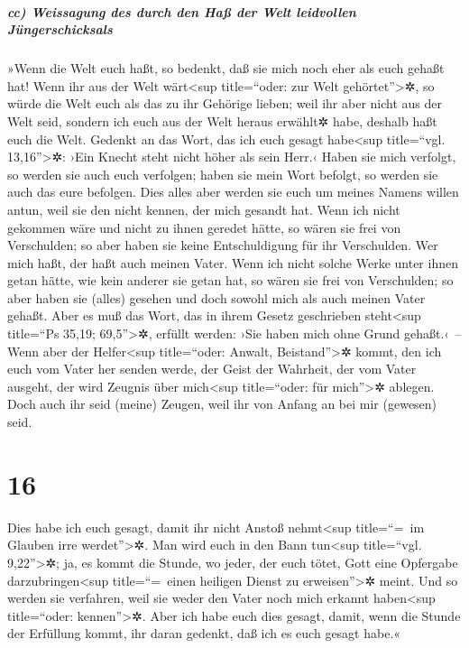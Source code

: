 \hypertarget{cc-weissagung-des-durch-den-hauxdf-der-welt-leidvollen-juxfcngerschicksals}{%
\subparagraph{cc) Weissagung des durch den Haß der Welt leidvollen
Jüngerschicksals}\label{cc-weissagung-des-durch-den-hauxdf-der-welt-leidvollen-juxfcngerschicksals}}

 »Wenn die Welt euch haßt, so bedenkt, daß sie mich noch
eher als euch gehaßt hat!  Wenn ihr aus der Welt
wärt\textless sup title=``oder: zur Welt gehörtet''\textgreater✲, so
würde die Welt euch als das zu ihr Gehörige lieben; weil ihr aber nicht
aus der Welt seid, sondern ich euch aus der Welt heraus erwählt✲ habe,
deshalb haßt euch die Welt.  Gedenkt an das Wort, das ich
euch gesagt habe\textless sup title=``vgl. 13,16''\textgreater✲: ›Ein
Knecht steht nicht höher als sein Herr.‹ Haben sie mich verfolgt, so
werden sie auch euch verfolgen; haben sie mein Wort befolgt, so werden
sie auch das eure befolgen.  Dies alles aber werden sie
euch um meines Namens willen antun, weil sie den nicht kennen, der mich
gesandt hat.  Wenn ich nicht gekommen wäre und nicht zu
ihnen geredet hätte, so wären sie frei von Verschulden; so aber haben
sie keine Entschuldigung für ihr Verschulden.  Wer mich
haßt, der haßt auch meinen Vater.  Wenn ich nicht solche
Werke unter ihnen getan hätte, wie kein anderer sie getan hat, so wären
sie frei von Verschulden; so aber haben sie (alles) gesehen und doch
sowohl mich als auch meinen Vater gehaßt.  Aber es muß
das Wort, das in ihrem Gesetz geschrieben steht\textless sup title=``Ps
35,19; 69,5''\textgreater✲, erfüllt werden: ›Sie haben mich ohne Grund
gehaßt.‹~--  Wenn aber der Helfer\textless sup
title=``oder: Anwalt, Beistand''\textgreater✲ kommt, den ich euch vom
Vater her senden werde, der Geist der Wahrheit, der vom Vater ausgeht,
der wird Zeugnis über mich\textless sup title=``oder: für
mich''\textgreater✲ ablegen.  Doch auch ihr seid (meine)
Zeugen, weil ihr von Anfang an bei mir (gewesen) seid.

\hypertarget{section-15}{%
\section{16}\label{section-15}}

 Dies habe ich euch gesagt, damit ihr nicht Anstoß
nehmt\textless sup title=``=~im Glauben irre werdet''\textgreater✲.
 Man wird euch in den Bann tun\textless sup title=``vgl.
9,22''\textgreater✲; ja, es kommt die Stunde, wo jeder, der euch tötet,
Gott eine Opfergabe darzubringen\textless sup title=``=~einen heiligen
Dienst zu erweisen''\textgreater✲ meint.  Und so werden
sie verfahren, weil sie weder den Vater noch mich erkannt
haben\textless sup title=``oder: kennen''\textgreater✲. 
Aber ich habe euch dies gesagt, damit, wenn die Stunde der Erfüllung
kommt, ihr daran gedenkt, daß ich es euch gesagt habe.«

